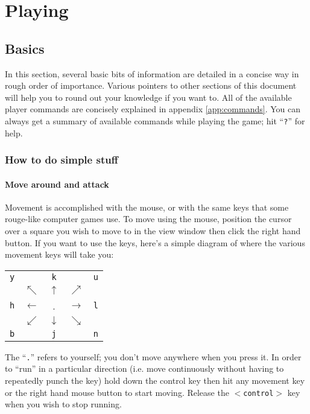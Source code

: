 
\chapter{Playing \cf}

\section{Basics}\label{sec:basic}

In this section, several basic bits of information are detailed in 
a concise way in rough order of importance.
Various pointers to other sections of this document will help you to 
round out your knowledge if you want to. All of the available player
commands are concisely explained in appendix \ref{app:commands}. You
can always get a summary of available commands while playing the game;
hit ``{\tt ?}'' for help. \\

\subsection{How to do simple stuff} 

\subsubsection{Move around and attack} 
Movement is accomplished with the mouse, or
with the same keys that some rouge-like computer games use. To move using
the mouse, position the cursor over a square you wish to move to
in the view window 
then click the right hand button. If you want to use the keys, here's a 
simple diagram of where the various movement keys will take you: \\ 
\begin{center}
\begin{tabular}{ccccc} 
{\tt y} &  & {\tt k} &  & {\tt u} \\
  & $\nwarrow$  & $\uparrow$  & $\nearrow$ &   \\
{\tt h} & $\longleftarrow$ & .  & $\longrightarrow$ & {\tt l} \\ 
  & $\swarrow$  & $\downarrow$  & $\searrow$ &   \\
{\tt b} &  & {\tt j} &  & {\tt n} \\
\end{tabular}
\end{center}
The ``{\tt .}'' refers to yourself; you don't move anywhere when you
press it. 
In order to ``run'' in a particular direction (i.e. move continuously 
without having to repeatedly punch the key) hold down the control
key then hit any movement key or the right hand mouse button to
start moving. Release the {\tt $<$control$>$} key when you wish to stop running. 

